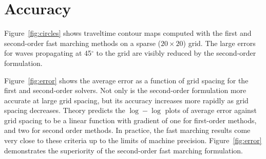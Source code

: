 
\section{Accuracy}


Figure~\ref{fig:circles} shows traveltime
contour maps computed with the first and second-order fast marching
methods on a sparse ($20 \times 20$) grid. 
The large errors for waves propagating at 45$^\circ$ to the grid are
visibly reduced by the second-order formulation.

\par
Figure~\ref{fig:error} shows the average error as a function of grid
spacing for the first and second-order solvers.  Not only is the
second-order formulation more accurate at large grid spacing, but its
accuracy increases more rapidly as grid spacing decreases. 
Theory predicts the $\log-\log$ plots of average error against
grid spacing to be a linear function with gradient of one for
first-order methods, and two for second order methods. 
In practice, the fast marching results come very close to these
criteria up to the limits of machine precision.
Figure~\ref{fig:error} demonstrates the superiority of the  
second-order fast marching formulation.

